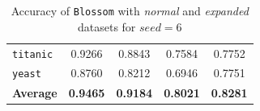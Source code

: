 \documentclass[12pt]{report}
\theoremstyle{definition}
\theoremstyle{definition}
\theoremstyle{definition}
\begin{document}
\begin{table}[ht]
\begin{tabular}{lcccc}
    \multicolumn{1}{l}{\tt titanic}       & \multicolumn{1}{c}{0.9266} & \multicolumn{1}{c}{0.8843} & \multicolumn{1}{c}{0.7584} & \multicolumn{1}{c}{0.7752} \\
    \multicolumn{1}{l}{\tt yeast}         & \multicolumn{1}{c}{0.8760} & \multicolumn{1}{c}{0.8212} & \multicolumn{1}{c}{0.6946} & \multicolumn{1}{c}{0.7751} \\
    \hline
    \multicolumn{1}{l}{\bf Average}       & \multicolumn{1}{c}{\bf 0.9465} & \multicolumn{1}{c}{\bf 0.9184} & \multicolumn{1}{c}{\bf 0.8021} & \multicolumn{1}{c}{\bf 0.8281} \\
    \hline
    \end{tabular}
    \caption{Accuracy of \texttt{Blossom} with \textit{normal} and \textit{expanded} datasets for $seed=6$}
    \label{fig:seed6}
\end{table}
\end{document}
